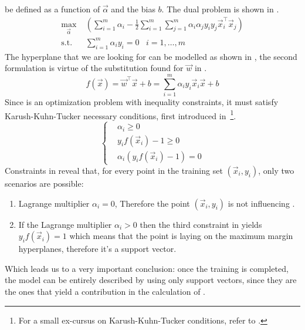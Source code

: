 be defined as a function of $\vec{\alpha}$ and the bias $b$. The dual problem is shown in .
\begin{equation}
	\label{eq:dual}
	\begin{aligned}
		\max_{\vec{\alpha}}       & \left(\sum_{i = 1}^{m}{\alpha_i} - \frac{1}{2}\sum_{i =
		1}^{m}\sum_{j = 1}^{m}{\alpha_i\alpha_j y_i y_j \vec{x}_i^\top\vec{x}_j}\right)               \\
		\text{s.t.} \hspace{10pt} & \sum_{i = 1}^{m}{\alpha_i y_i} = 0 \hspace{10pt} i = 1, \ldots, m
	\end{aligned}
\end{equation}
The hyperplane that we are looking for can be modelled as shown in , the second
formulation is virtue of the substitution found for $\vec{w}$ in .
\begin{equation}
	\label{eq:of}
	f(\vec{x}) = \vec{w}^\top\vec{x} + b = \sum_{i = 1}^m\alpha_iy_i\vec{x}_i\vec{x} + b
\end{equation}
Since  is an optimization problem with inequality constraints, it must satisfy
Karush-Kuhn-Tucker necessary conditions, first introduced in~\cite{kkt1951}\footnote{For a small
ex-cursus on Karush-Kuhn-Tucker conditions, refer to .}.
\begin{equation}
	\label{eq:kkt-constraints}
	\begin{cases}
		 & \alpha_i \geq 0                   \\
		 & y_if(\vec{x}_i) - 1 \geq 0        \\
		 & \alpha_i(y_if(\vec{x}_i) - 1) = 0
	\end{cases}
\end{equation}
Constraints in  reveal that, for every point in the training set $(\vec{x}_i, y_i)$, only two scenarios are possible:
\begin{enumerate}
	\item Lagrange multiplier $\alpha_i = 0$, Therefore the point $(\vec{x}_i, y_i)$ is not
		influencing .
	\item If the Lagrange multiplier $\alpha_i > 0$ then the third constraint in
	       yields $y_if(\vec{x}_i) = 1$ which means that the point is
	      laying on the maximum margin hyperplanes, therefore it's a support vector.
\end{enumerate}
Which leads us to a very important conclusion: once the training is completed, the model can be entirely
described by using only support vectors, since they are the ones that yield a contribution in the
calculation of .

